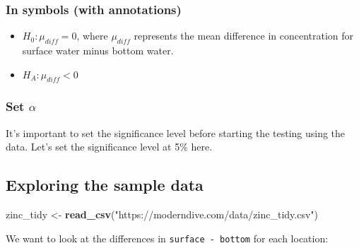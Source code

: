 \documentclass[12pt, krantz2,]{krantz}
\makeatletter
\newenvironment{Shaded}{\begin{snugshade}}{\end{snugshade}}
\newcommand{\DataTypeTok}[1]{\textcolor[rgb]{0.27,0.27,0.27}{#1}}
\newcommand{\KeywordTok}[1]{\textcolor[rgb]{0.27,0.27,0.27}{\textbf{#1}}}
\newcommand{\NormalTok}[1]{#1}
\newcommand{\OperatorTok}[1]{\textcolor[rgb]{0.43,0.43,0.43}{\textbf{#1}}}
\newcommand{\StringTok}[1]{\textcolor[rgb]{0.5,0.5,0.5}{#1}}
\providecommand{\tightlist}{%
  \setlength{\itemsep}{0pt}\setlength{\parskip}{0pt}}
\newenvironment{kframe}{%
\medskip{}
\setlength{\fboxsep}{.8em}
 \def\at@end@of@kframe{}%
 \ifinner\ifhmode%
  \def\at@end@of@kframe{\end{minipage}}%
  \begin{minipage}{\columnwidth}%
 \fi\fi%
 \def\FrameCommand##1{\hskip\@totalleftmargin \hskip-\fboxsep
 \colorbox{shadecolor}{##1}\hskip-\fboxsep
     \hskip-\linewidth \hskip-\@totalleftmargin \hskip\columnwidth}%
 \MakeFramed {\advance\hsize-\width
   \@totalleftmargin\z@ \linewidth\hsize
   \@setminipage}}%
 {\par\unskip\endMakeFramed%
 \at@end@of@kframe}
\renewenvironment{Shaded}{\begin{kframe}}{\end{kframe}}
\makeatother
\begin{document}
\hypertarget{in-symbols-with-annotations-4}{%
\subsubsection*{In symbols (with annotations)}\label{in-symbols-with-annotations-4}}


\begin{itemize}
\tightlist
\item
  \(H_0: \mu_{diff} = 0\), where \(\mu_{diff}\) represents the mean difference in concentration for surface water minus bottom water.
\item
  \(H_A: \mu_{diff} < 0\)
\end{itemize}

\hypertarget{set-alpha-4}{%
\subsubsection*{\texorpdfstring{Set \(\alpha\)}{Set \textbackslash{}alpha}}\label{set-alpha-4}}


It's important to set the significance level before starting the testing using the data. Let's set the significance level at 5\% here.

\hypertarget{exploring-the-sample-data-4}{%
\subsection{Exploring the sample data}\label{exploring-the-sample-data-4}}

\begin{Shaded}
\begin{Highlighting}[]
\NormalTok{zinc_tidy <-}\StringTok{ }\KeywordTok{read_csv}\NormalTok{(}\StringTok{"https://moderndive.com/data/zinc_tidy.csv"}\NormalTok{)}
\end{Highlighting}
\end{Shaded}

We want to look at the differences in \texttt{surface\ -\ bottom} for each location:

\begin{Shaded}
\end{Shaded}
\end{document}
